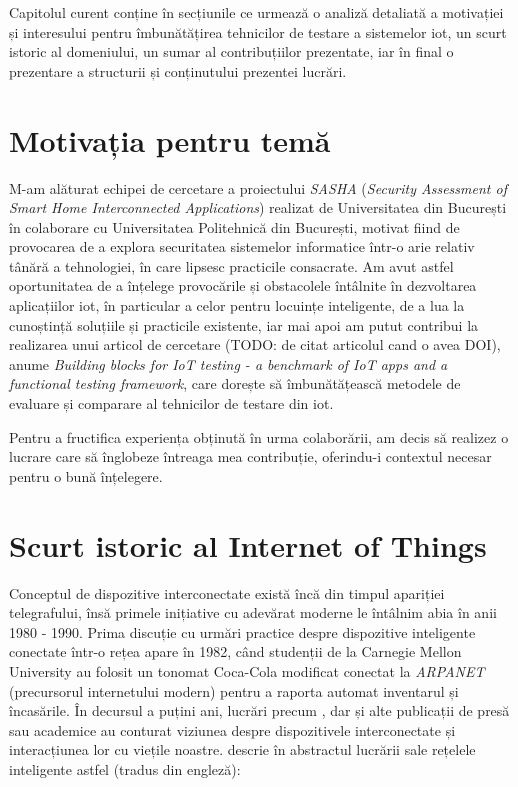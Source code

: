 Capitolul curent conține în secțiunile ce urmează o analiză detaliată a motivației și interesului pentru îmbunătățirea tehnicilor de testare a sistemelor \acrshort{iot}, un scurt istoric al domeniului, un sumar al contribuțiilor prezentate, iar în final o prezentare a structurii și conținutului prezentei lucrări.

\section{Motivația pentru temă}

M-am alăturat echipei de cercetare a proiectului \textit{SASHA} (\textit{Security Assessment of Smart Home Interconnected Applications}) realizat de Universitatea din București în colaborare cu Universitatea Politehnică din București, motivat fiind de provocarea de a explora securitatea sistemelor informatice într-o arie relativ tânără a tehnologiei, în care lipsesc practicile consacrate. Am avut astfel oportunitatea de a înțelege provocările și obstacolele întâlnite în dezvoltarea aplicațiilor \acrshort{iot}, în particular a celor pentru locuințe inteligente, de a lua la cunoștință soluțiile și practicile existente, iar mai apoi am putut contribui la realizarea unui articol de cercetare (TODO: de citat articolul cand o avea DOI), anume \textit{Building blocks for IoT testing - a benchmark of IoT apps and a functional testing framework}, care dorește să îmbunătățească metodele de evaluare și comparare al tehnicilor de testare din \acrlong{iot}.

Pentru a fructifica experiența obținută în urma colaborării, am decis să realizez o lucrare care să înglobeze întreaga mea contribuție, oferindu-i contextul necesar pentru o bună înțelegere. 

\section{Scurt istoric al Internet of Things}


Conceptul de dispozitive interconectate există încă din timpul apariției telegrafului, însă primele inițiative cu adevărat moderne le întâlnim abia în anii 1980 - 1990. Prima discuție cu urmări practice despre dispozitive inteligente conectate într-o rețea apare în 1982, când studenții de la  Carnegie Mellon University au folosit un tonomat Coca-Cola modificat conectat la \textit{ARPANET} (precursorul internetului modern) pentru a raporta automat inventarul și încasările. În decursul a puțini ani, lucrări precum \cite{Weiser1999}, dar și alte publicații de presă sau academice au conturat viziunea despre dispozitivele interconectate și interacțiunea lor cu viețile noastre. \cite{Raji1994} descrie în abstractul lucrării sale rețelele inteligente astfel (tradus din engleză):

